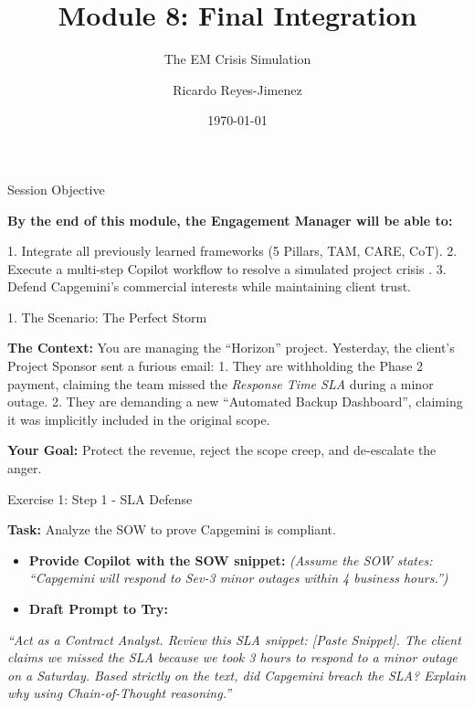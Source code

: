\documentclass[aspectratio=169]{beamer}
\title[Module 8: Final Integration]{Module 8: Final Integration}
\subtitle{The EM Crisis Simulation}
\author{Ricardo Reyes-Jimenez}
\institute{Capgemini}
\date{\today}
\begin{document}
\begin{frame}
  \titlepage
\end{frame}

\usebackgroundtemplate{}



\begin{frame}[fragile]{Session Objective}


\textbf{By the end of this module, the Engagement Manager will be able to:}

1. Integrate all previously learned frameworks (5 Pillars, TAM, CARE, CoT).
2. Execute a multi-step Copilot workflow to resolve a simulated project crisis \cite{cot2026}.
3. Defend Capgemini's commercial interests while maintaining client trust.

\end{frame}



\begin{frame}[fragile]{1. The Scenario: The Perfect Storm}


\textbf{The Context:}
You are managing the ``Horizon'' project. Yesterday, the client's Project Sponsor sent a furious email:
1. They are withholding the Phase 2 payment, claiming the team missed the \textit{Response Time SLA} during a minor outage.
2. They are demanding a new ``Automated Backup Dashboard'', claiming it was implicitly included in the original scope.

\textbf{Your Goal:} Protect the revenue, reject the scope creep, and de-escalate the anger.

\end{frame}



\begin{frame}[fragile]{Exercise 1: Step 1 - SLA Defense}


\textbf{Task:} Analyze the SOW to prove Capgemini is compliant.

\begin{itemize}
  \item \textbf{Provide Copilot with the SOW snippet:} \textit{(Assume the SOW states: ``Capgemini will respond to Sev-3 minor outages within 4 business hours.'')}
  \item \textbf{Draft Prompt to Try:}
\end{itemize}
\textit{``Act as a Contract Analyst. Review this SLA snippet: [Paste Snippet]. The client claims we missed the SLA because we took 3 hours to respond to a minor outage on a Saturday. Based strictly on the text, did Capgemini breach the SLA? Explain why using Chain-of-Thought reasoning.''}

\end{frame}
\end{document}
